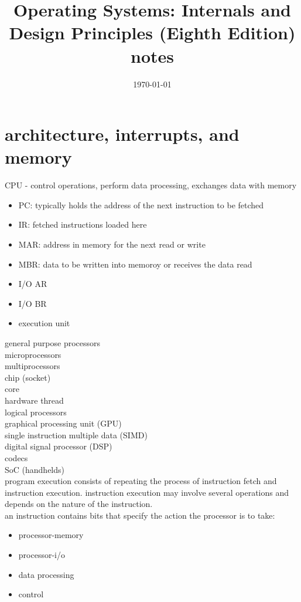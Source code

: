 \documentclass[parindent=0pt]{article}
\title{Operating Systems: Internals and Design Principles (Eighth Edition) notes}
\date{\today}
\begin{document}
\maketitle

\section*{architecture, interrupts, and memory}
CPU - control operations, perform data processing, exchanges data with memory 
	\begin{itemize}
		\item PC: typically holds the address of the next instruction to be fetched
		\item IR: fetched instructions loaded here
		\item MAR: address in memory for the next read or write
		\item MBR: data to be written into memoroy or receives the data read
		\item I/O AR
		\item I/O BR
		\item execution unit
	\end{itemize}

general purpose processors\\
microprocessors\\
multiprocessors\\
chip (socket)\\
core\\
hardware thread\\
logical processors\\
graphical processing unit (GPU)\\
single instruction multiple data (SIMD)\\
digital signal processor (DSP)\\
codecs\\
SoC (handhelds)\\

program execution consists of repeating the process of instruction fetch and instruction execution. instruction execution may involve several operations and depends on the nature of the instruction.\\

an instruction contains bits that specify the action the processor is to take:
	\begin{itemize}
		\item processor-memory
		\item processor-i/o
		\item data processing
		\item control
	\end{itemize}
\end{document}
